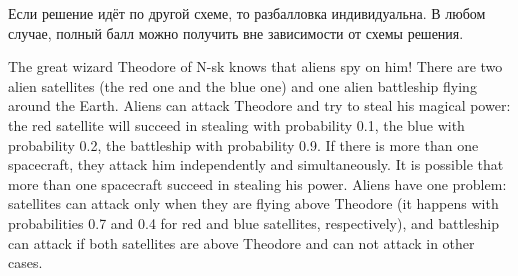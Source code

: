 \documentclass[addpoints, answers]{exam} %
\begin{document}
\begin{questions}
\begin{solution}
Если решение идёт по другой схеме, то разбалловка индивидуальна. В любом случае, полный балл можно получить вне зависимости от схемы решения.



\end{solution}

\question The great wizard Theodore of N-sk knows that aliens spy on him! There are two alien satellites (the red one and the blue one) and one alien battleship flying around the Earth. Aliens can attack Theodore and try to steal his magical power: the red satellite will succeed in stealing with probability 0.1, the blue with probability 0.2, the battleship with probability 0.9. If there is more than one spacecraft, they attack him independently and simultaneously. It is possible that more than one spacecraft succeed in stealing his power. Aliens have one problem: satellites can attack only when they are flying above Theodore (it happens with probabilities 0.7 and 0.4 for red and blue satellites, respectively), and battleship can attack if both satellites are above Theodore and can not attack in other cases.


\end{questions}
\end{document}
